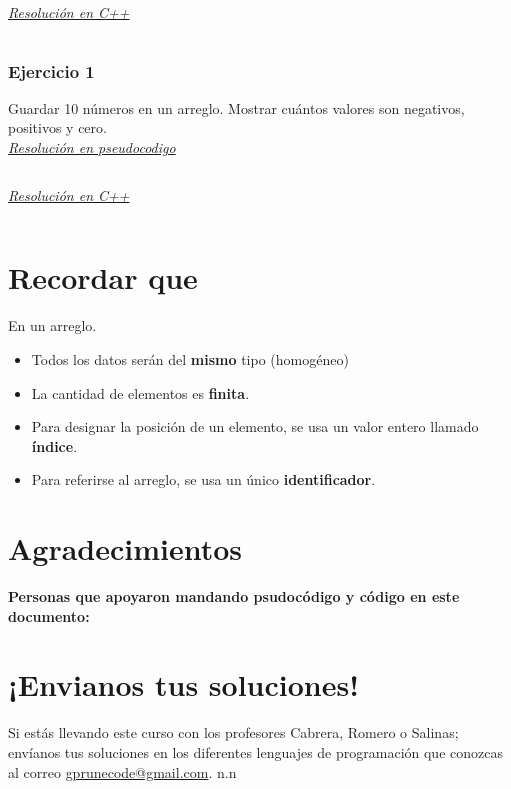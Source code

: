 \documentclass{article}
\begin{document}
\underline{\textit{Resolución en C++}}\\
\inputminted{cpp}{./cpp/001_ejemplo.cpp}


\subsubsection*{Ejercicio 1}%
Guardar 10 números en un arreglo. Mostrar cuántos valores son negativos, positivos y cero.\\

\underline{\textit{Resolución en pseudocodigo}}\\
\inputminted{./pseudocode.py:PseudocodeLexer -x}{./pseudocodigo/001_ejercicio.algo}

\underline{\textit{Resolución en C++}}\\
\inputminted{cpp}{./cpp/001_ejercicio.cpp}


\section{Recordar que}%
En un arreglo.
\begin{itemize}
  \item Todos los datos serán del \textbf{mismo} tipo (homogéneo)
  \item La cantidad de elementos es \textbf{finita}.
  \item Para designar la posición de un elemento, se usa un valor entero llamado \textbf{índice}.
  \item Para referirse al arreglo, se usa un único \textbf{identificador}.
\end{itemize}
\newpage


\section*{Agradecimientos}
\textbf{Personas que apoyaron mandando psudocódigo y código en este documento:}\\

\vspace{3cm} 
\section*{¡Envianos tus soluciones!}
Si estás llevando este curso con los profesores Cabrera, Romero o Salinas;
envíanos tus soluciones en los diferentes lenguajes de programación que
conozcas al correo \href{mailto:gprunecode@gmail.com}{gprunecode@gmail.com}.
n.n \\ 
\end{document}
